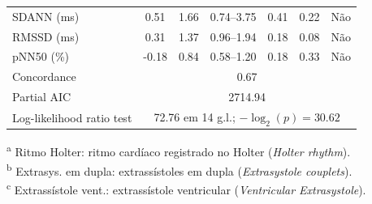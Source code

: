 \begin{table}[htbp]
{\begin{tabular}{lcccccc}
			SDANN (ms)                                & 0.51                                                     & 1.66 & 0.74--3.75 & 0.41 & 0.22     & N\~ao           \\
			RMSSD (ms)                                & 0.31                                                     & 1.37 & 0.96--1.94 & 0.18 & 0.08     & N\~ao           \\
			pNN50 (\%)                                & -0.18                                                    & 0.84 & 0.58--1.20 & 0.18 & 0.33     & N\~ao           \\
			\midrule
			Concordance                               & \multicolumn{6}{c}{0.67}                                                                                         \\
			Partial AIC                               & \multicolumn{6}{c}{2714.94}                                                                                      \\
			Log-likelihood ratio test                 & \multicolumn{6}{c}{72.76 em 14 g.l.; $-\log_2(p)=30.62$}                                                         \\
			\bottomrule
		\end{tabular}%
	}
	\begin{flushleft}
		\footnotesize
		\textsuperscript{a} Ritmo Holter: ritmo cardíaco registrado no Holter (\textit{Holter rhythm}).\\
		\textsuperscript{b} Extrasys. em dupla: extrassístoles em dupla (\textit{Extrasystole couplets}).\\
		\textsuperscript{c} Extrassístole vent.: extrassístole ventricular (\textit{Ventricular Extrasystole}).
	\end{flushleft}
\end{table}

